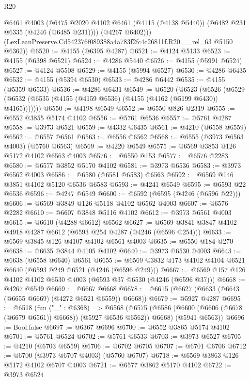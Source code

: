\begin{lexlean}{R20}
\begin{coremodule}
          @6461
          @4003
          (@6475 @2020 @4102 @6461 (@4115 (@4138 @5440)) (@6482 @231 @6335 (@4246 (@6485 @231))))
          (@4267 @6402)))
      (LexLeanPreserve.Cd542376f089388a4a783f2fc4c26811f.R20.__rel_63 @5150 @6362))
@6520 := @4155 (@6395 @4287)
@6521 := @4124 @5133
@6523 := @4155 (@6398 @6521)
@6524 := @4286 @5440
@6526 := @4155 (@5991 @6524)
@6527 := @4124 @5508
@6529 := @4155 (@5994 @6527)
@6530 := @4286 @6435
@6532 := @4155 (@5394 @6530)
@6533 := @4286 @6442
@6535 := @4155 (@5359 @6533)
@6536 := @4286 @6431
@6549 := @6520
    (@6523
      (@6526 (@6529 (@6532 (@6535 (@4155 (@4159 @6536) (@4155 (@4162 (@5199 @6430)) @4165)))))))
@6550 := @4198 @6549
@6552 := @6550 @826 @2319
@6555 := @6552 @3855 @5174 @4102
@6556 := @5761 @6536
@6557 := @5761 @4287
@6558 := @3973 @6521
@6559 := @4332 @6435
@6561 := @4210 (@6558 @6559)
@6562 := @6557 @6561
@6563 := @6556 @6562
@6568 := @6555 (@3973 @6563 @4003) (@5760 @6563)
@6569 := @4220 @6549
@6575 := @6569 @3853 @126 @5172 @4102 @6563 @4003
@6576 := @6550 @153
@6577 := @6576 @2283
@6580 := @6577 @3852 @5170 @4102
@6581 := @3973 @6536
@6583 := @3973 @6562 @4003
@6586 := @6580 (@6581 @6583) @6563
@6592 := @6569 @146 @3851 @4102 @5120 @6536 @6583
@6593 := @4241 @6549
@6595 := @6593 @22 @6536
@6596 := @4247 @6549
@6600 := @6592 (@6595 (@4246 (@6596 @22)))
@6606 := @6569 @3849 @126 @5118 @4102 @6562 @4003
@6607 := @6576 @2282
@6610 := @6607 @3848 @5116 @4102
@6612 := @3973 @6561 @4003
@6615 := @6610 (@4288 @6612) @6562
@6627 := @6569 @3841 @3847 @4102 @4918 @4287 @6612 (@6593 @254 @4287 (@4246 (@6596 @254)))
@6633 := @6569 @3845 @126 @4107 @4102 @6561 @4003
@6635 := @6550 @184 @270
@6638 := @6635 @3844 @4105 @4102
@6640 := @3973 @6530 @4003
@6643 := @6638 (@6558 @6640) @6561
@6655 := @6569 @3832 @173 @4102 @4104 @6521 @6640 (@6593 @249 @6521 (@4246 (@6596 @249)))
@6667 := @6569 @157 @126 @4102 @4102 @6530 @4003 (@6593 @37 @6530 (@4246 (@6596 @37)))
@6668 := @4267 @6549
@6669 := @6667 @6668
@6678 := @6615 (@6627 (@6633 (@6643 (@6655 @6669) (@4272 @6521 @6559)) @6668))
@6679 := @5927 @4287
@6695 := @6518
    (fun ("_" : @6368) =>
    @6568
      (@6575 (@6586 (@6600 (@6606 (@6678 (@6679 @6561)) @6668)) (@5927 @6536 @6562)) @6668)
      (@5941 @6563))
@6696 := Bool.false
@6697 := @6367 @6696
@6700 := @6552 @3865 @5174 @4102
@6701 := @5761 @6524
@6702 := @5761 @6533
@6703 := @3973 @6527
@6705 := @4210 (@6703 @6559)
@6706 := @6702 @6705
@6707 := @6701 @6706
@6712 := @6700 (@3973 @6707 @4003) (@5760 @6707)
@6718 := @6569 @3863 @126 @5172 @4102 @6707 @4003
@6721 := @6577 @3862 @5170 @4102
@6722 := @3973 @6524

\end{coremodule}
\end{lexlean}
